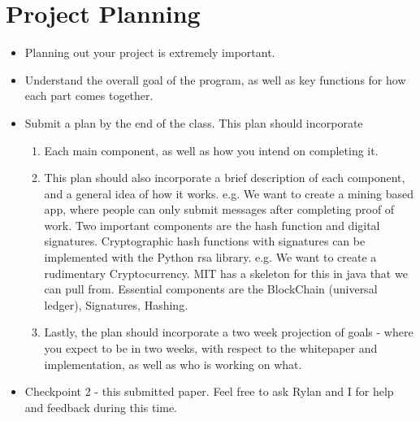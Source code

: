\documentclass{article}
\begin{document}
\section*{Project Planning}
\begin{itemize}
  \item Planning out your project is extremely important. 
  \item Understand the overall goal of the program, as well as key functions for how 
    each part comes together.
  \item Submit a plan by the end of the class. This plan should incorporate 
    \begin{enumerate}
      \item Each main component, as well as how you intend on completing it. 
      \item This plan should also incorporate a brief description of each component, and a general idea of how it works. 
        \subitem e.g. We want to create a mining based app, where people can only submit messages after completing proof of work. Two important components
        are the hash function and digital signatures. Cryptographic hash functions with signatures can be implemented with the Python rsa library.
        \subitem e.g. We want to create a rudimentary Cryptocurrency. MIT has a skeleton for this in java that we can pull from. Essential components are the BlockChain (universal ledger), 
      Signatures, Hashing.
      \item Lastly, the plan should incorporate a two week projection of goals - where you expect to be in two weeks, with respect to the whitepaper and implementation, as well as
        who is working on what.
    \end{enumerate}
    \item Checkpoint 2 - this submitted paper. 
      \subitem Feel free to ask Rylan and I for help and feedback during this time. 
\end{itemize}
\end{document}
